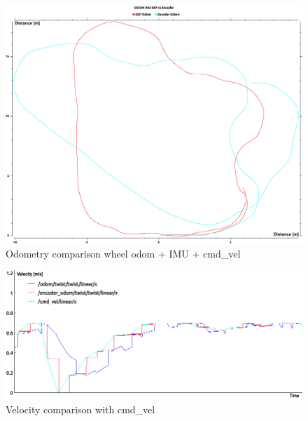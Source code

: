 \begin{figure} 
	\includegraphics[width=\textwidth]{Pictures/odom after one round}
	\caption{Odometry comparison wheel odom + IMU + cmd\_vel}
	\label{Odometry comparison wheel odomIMUcmdvel}

\end{figure}
\begin{figure} 
	\includegraphics[width=\textwidth]{Pictures/circle vel}
	\caption{Velocity comparison with cmd\_vel}
	\label{velwithcmd}
\end{figure}



